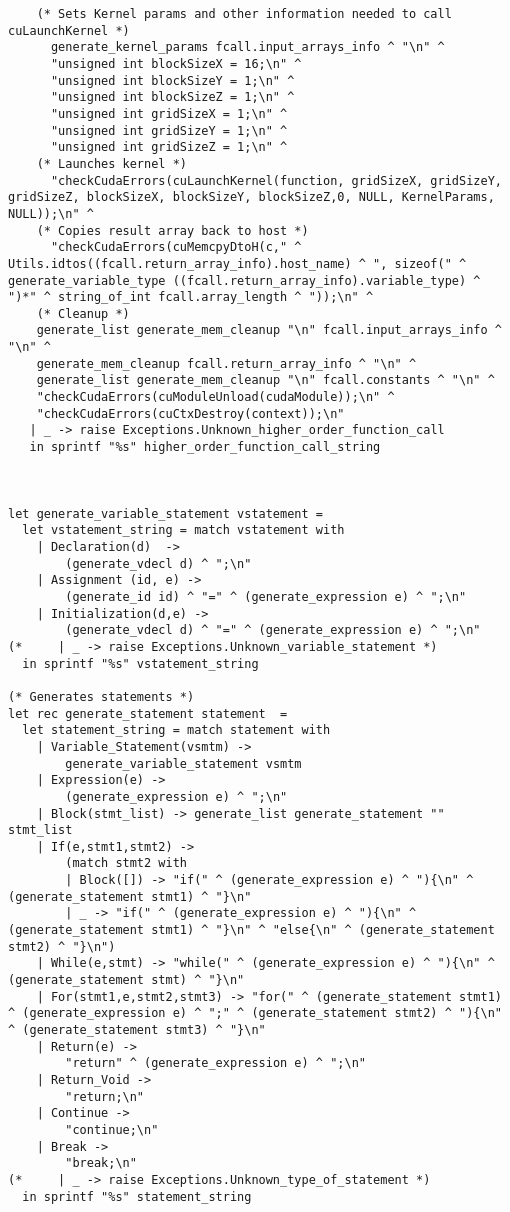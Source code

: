 \begin{verbatim}
    (* Sets Kernel params and other information needed to call cuLaunchKernel *)
      generate_kernel_params fcall.input_arrays_info ^ "\n" ^
      "unsigned int blockSizeX = 16;\n" ^ 
      "unsigned int blockSizeY = 1;\n" ^
      "unsigned int blockSizeZ = 1;\n" ^
      "unsigned int gridSizeX = 1;\n" ^
      "unsigned int gridSizeY = 1;\n" ^
      "unsigned int gridSizeZ = 1;\n" ^
    (* Launches kernel *)
      "checkCudaErrors(cuLaunchKernel(function, gridSizeX, gridSizeY, gridSizeZ, blockSizeX, blockSizeY, blockSizeZ,0, NULL, KernelParams, NULL));\n" ^
    (* Copies result array back to host *)
      "checkCudaErrors(cuMemcpyDtoH(c," ^ Utils.idtos((fcall.return_array_info).host_name) ^ ", sizeof(" ^ generate_variable_type ((fcall.return_array_info).variable_type) ^ ")*" ^ string_of_int fcall.array_length ^ "));\n" ^ 
    (* Cleanup *)
    generate_list generate_mem_cleanup "\n" fcall.input_arrays_info ^ "\n" ^ 
    generate_mem_cleanup fcall.return_array_info ^ "\n" ^ 
    generate_list generate_mem_cleanup "\n" fcall.constants ^ "\n" ^
    "checkCudaErrors(cuModuleUnload(cudaModule));\n" ^ 
    "checkCudaErrors(cuCtxDestroy(context));\n"
   | _ -> raise Exceptions.Unknown_higher_order_function_call
   in sprintf "%s" higher_order_function_call_string



let generate_variable_statement vstatement = 
  let vstatement_string = match vstatement with
    | Declaration(d)  -> 
        (generate_vdecl d) ^ ";\n"
    | Assignment (id, e) -> 
        (generate_id id) ^ "=" ^ (generate_expression e) ^ ";\n"
    | Initialization(d,e) ->
        (generate_vdecl d) ^ "=" ^ (generate_expression e) ^ ";\n"
(*     | _ -> raise Exceptions.Unknown_variable_statement *)
  in sprintf "%s" vstatement_string

(* Generates statements *)
let rec generate_statement statement  =
  let statement_string = match statement with
    | Variable_Statement(vsmtm) -> 
        generate_variable_statement vsmtm  
    | Expression(e) -> 
        (generate_expression e) ^ ";\n"
    | Block(stmt_list) -> generate_list generate_statement "" stmt_list
    | If(e,stmt1,stmt2) -> 
        (match stmt2 with 
        | Block([]) -> "if(" ^ (generate_expression e) ^ "){\n" ^ (generate_statement stmt1) ^ "}\n"
        | _ -> "if(" ^ (generate_expression e) ^ "){\n" ^ (generate_statement stmt1) ^ "}\n" ^ "else{\n" ^ (generate_statement stmt2) ^ "}\n")
    | While(e,stmt) -> "while(" ^ (generate_expression e) ^ "){\n" ^ (generate_statement stmt) ^ "}\n"
    | For(stmt1,e,stmt2,stmt3) -> "for(" ^ (generate_statement stmt1) ^ (generate_expression e) ^ ";" ^ (generate_statement stmt2) ^ "){\n" ^ (generate_statement stmt3) ^ "}\n"
    | Return(e) ->
        "return" ^ (generate_expression e) ^ ";\n"
    | Return_Void ->  
        "return;\n"
    | Continue ->
        "continue;\n"
    | Break ->
        "break;\n"
(*     | _ -> raise Exceptions.Unknown_type_of_statement *)
  in sprintf "%s" statement_string



\end{verbatim}
